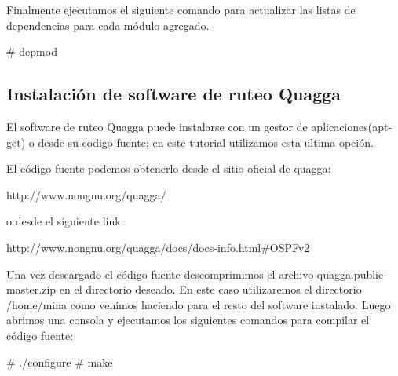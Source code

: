 Finalmente ejecutamos el siguiente comando para actualizar las listas de dependencias para cada módulo agregado.

\begin{bash}
# depmod
\end{bash}

\subsection{Instalación de software de ruteo Quagga}
El software de ruteo Quagga puede instalarse con un gestor de aplicaciones(apt-get) o desde su codigo fuente; en este tutorial utilizamos esta ultima opción. 

El código fuente podemos obtenerlo desde el sitio oficial de quagga:

\begin{center}
http://www.nongnu.org/quagga/
\end{center}
 
o desde el siguiente link:

\begin{center}
http://www.nongnu.org/quagga/docs/docs-info.html\#OSPFv2
\end{center}

Una vez descargado el código fuente descomprimimos el archivo quagga.public-master.zip en el directorio deseado. En este caso utilizaremos el directorio /home/mina como venimos haciendo para el resto del software instalado. Luego abrimos una consola y ejecutamos los siguientes comandos para compilar el código fuente:

\begin{bash}
# ./configure
# make 
\end{bash}
